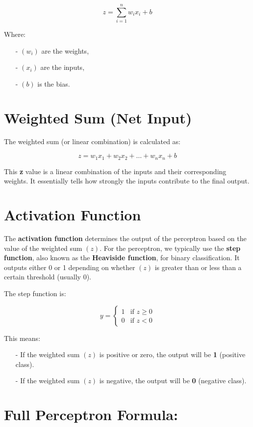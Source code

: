 \documentclass[10pt]{article}
\begin{document}
$$
z = \sum_{i=1}^{n} w_i x_i + b
$$

Where:
\begin{itemize}
   \item [-] $(w_i)$ are the weights,
   \item [-] $(x_i)$ are the inputs,
   \item [-] $(b)$ is the bias.
\end{itemize}

\section{{\bf Weighted Sum} (Net Input)}
The weighted sum (or linear combination) is calculated as:

$$
z = w_1 x_1 + w_2 x_2 + \dots + w_n x_n + b
$$

This {\bf z} value is a linear combination of the inputs and their corresponding weights. It essentially tells how strongly the inputs contribute to the final output.

\section{{\bf Activation Function}}
The {\bf activation function} determines the output of the perceptron based on 
the value of the weighted sum $(z)$. For the perceptron, we typically use the {\bf step function}, 
also known as the {\bf Heaviside function}, for binary classification. It outputs either 0 or 1 depending on whether $(z)$ is greater than or less than a certain threshold (usually 0).

The step function is:

$$
y = 
\begin{cases}
1 & \text{if } z \geq 0 \\
0 & \text{if } z < 0
\end{cases}
$$

This means:
\begin{itemize}
   \item [-] If the weighted sum $(z)$ is positive or zero, the output will be {\bf 1} (positive class).
   \item [-] If the weighted sum $(z)$ is negative, the output will be {\bf 0} (negative class).
\end{itemize}

\section{Full Perceptron Formula:}
\end{document}
